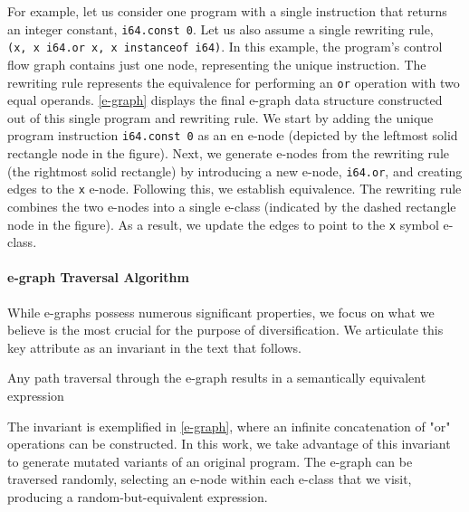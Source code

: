 \documentclass[sigplan,screen]{acmart}
\newcommand*\badge[1]{ \colorbox{red}{\color{white}#1}}
\newcommand{\todo}[1]{%
\refstepcounter{todo}
\noindent\textbf{\badge{TODO}} {\color{red}#1}
\addcontentsline{td}{todo}
{\color{red}\thesection.\thetodo\xspace #1}}
\begin{document}
For example, let us consider one program with a single instruction that returns an integer constant, \texttt{i64.const 0}. Let us also assume a single rewriting rule, \texttt{(x,\ x\ i64.or\ x, x instanceof i64)}. 
In this example, the program's control flow graph contains just one node, representing the unique instruction.
The rewriting rule represents the equivalence for performing an \texttt{or} operation with two equal operands.
\autoref{e-graph} displays the final e-graph data structure constructed out of this single program and rewriting rule. 
We start by adding the unique program instruction \texttt{i64.const 0} as an en e-node (depicted by the leftmost solid rectangle node in the figure). 
Next, we generate e-nodes from the rewriting rule (the rightmost solid rectangle) by introducing a new e-node, \texttt{i64.or}, and creating edges to the \texttt{x} e-node.
Following this, we establish equivalence. 
The rewriting rule combines the two e-nodes into a single e-class (indicated by the dashed rectangle node in the figure). 
As a result, we update the edges to point to the \texttt{x} symbol e-class.


\paragraph{e-graph Traversal Algorithm}
\label{alg}
While e-graphs possess numerous significant properties, we focus on what we believe is the most crucial for the purpose of diversification. We articulate this key attribute as an invariant in the text that follows.

\begin{tcolorbox}[boxrule=1pt,arc=.3em,boxsep=-1.3mm]
Any path traversal through the e-graph results in a semantically equivalent expression
\end{tcolorbox}

The invariant is exemplified in \autoref{e-graph}, where an infinite concatenation of "or" operations can be constructed. 
In this work, we take advantage of this invariant to generate mutated variants of an original program. 
The e-graph can be traversed randomly, selecting an e-node within each e-class that we visit, producing a random-but-equivalent expression. 
\end{document}
